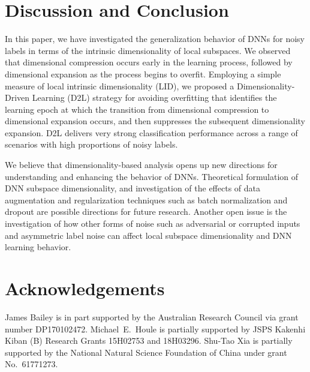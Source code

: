 \documentclass{article}
\begin{document}
\section{Discussion and Conclusion}
In this paper, we have investigated the generalization behavior of DNNs for noisy labels in terms of the intrinsic dimensionality of local subspaces. We observed that dimensional compression occurs early in the learning process, followed by dimensional expansion as the process begins to overfit. Employing a simple measure of local intrinsic dimensionality (LID), we proposed a Dimensionality-Driven Learning (D2L) strategy for avoiding overfitting that identifies the learning epoch at which the transition from dimensional compression to dimensional expansion occurs, and then suppresses the subsequent dimensionality expansion. D2L delivers very strong classification performance across a range of scenarios with high proportions of noisy labels.   

We believe that dimensionality-based analysis opens up new directions for understanding and enhancing the behavior of DNNs.
Theoretical formulation of DNN subspace dimensionality, and investigation of the effects of data augmentation and regularization techniques such as batch normalization \cite{ioffe2015batch} and dropout \cite{srivastava2014dropout} are possible directions for future research.  
Another open issue is the investigation of how other forms of noise such as adversarial or corrupted inputs and asymmetric label noise
can affect local subspace dimensionality and DNN learning behavior.






\section*{Acknowledgements}
James Bailey is in part supported by the Australian Research Council via grant number DP170102472. Michael~E.~Houle is partially supported by JSPS Kakenhi Kiban (B) Research Grants 15H02753 and 18H03296. Shu-Tao Xia is partially supported by the National Natural Science Foundation of China under grant No.~61771273.


\end{document}
